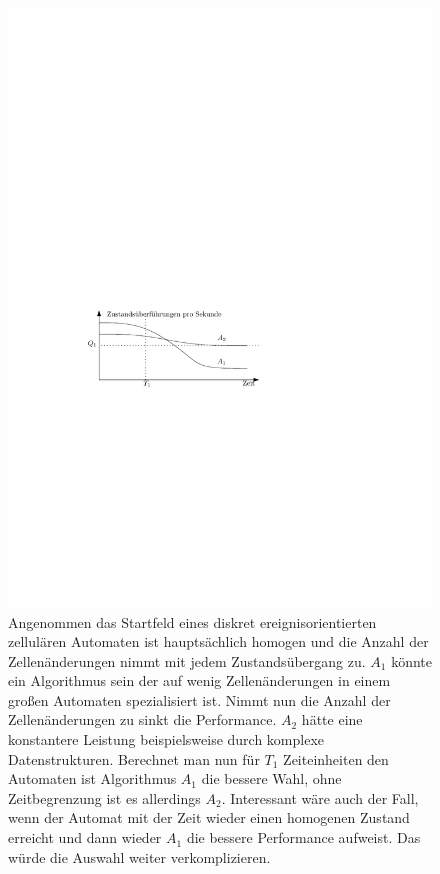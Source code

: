 \begin{figure}[h]
\centering
\includegraphics{ca.pdf}
\caption[Zelluläre Automaten und Algorithmenperformance]{Angenommen das Startfeld eines diskret ereignisorientierten zellulären Automaten ist hauptsächlich homogen und die Anzahl der Zellenänderungen nimmt mit jedem Zustandsübergang zu. $A_1$ könnte ein Algorithmus sein der auf wenig Zellenänderungen in einem großen Automaten spezialisiert ist. Nimmt nun die Anzahl der Zellenänderungen zu sinkt die Performance. $A_2$ hätte eine konstantere Leistung beispielsweise durch komplexe Datenstrukturen. Berechnet man nun für $T_1$ Zeiteinheiten den Automaten ist Algorithmus $A_1$ die bessere Wahl, ohne Zeitbegrenzung ist es allerdings $A_2$. Interessant wäre auch der Fall, wenn der Automat mit der Zeit wieder einen homogenen Zustand erreicht und dann wieder $A_1$ die bessere Performance aufweist. Das würde die Auswahl weiter verkomplizieren.}
\label{ca}
\end{figure}

